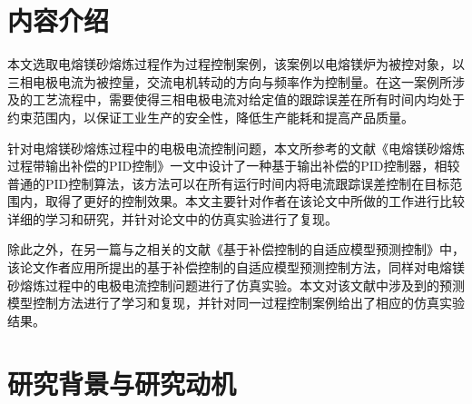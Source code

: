\documentclass[UTF8, 12pt]{article}
\begin{document}

\begin{titlepage}

\end{titlepage}

\tableofcontents
\cleardoublepage

%
\section{内容介绍}
本文选取电熔镁砂熔炼过程作为过程控制案例，该案例以电熔镁炉为被控对象，以三相电极电流为被控量，交流电机转动的方向与频率作为控制量。在这一案例所涉及的工艺流程中，需要使得三相电极电流对给定值的跟踪误差在所有时间内均处于约束范围内，以保证工业生产的安全性，降低生产能耗和提高产品质量。

针对电熔镁砂熔炼过程中的电极电流控制问题，本文所参考的文献《电熔镁砂熔炼过程带输出补偿的PID控制》一文中设计了一种基于输出补偿的PID控制器，相较普通的PID控制算法，该方法可以在所有运行时间内将电流跟踪误差控制在目标范围内，取得了更好的控制效果。本文主要针对作者在该论文中所做的工作进行比较详细的学习和研究，并针对论文中的仿真实验进行了复现。

除此之外，在另一篇与之相关的文献《基于补偿控制的自适应模型预测控制》中，该论文作者应用所提出的基于补偿控制的自适应模型预测控制方法，同样对电熔镁砂熔炼过程中的电极电流控制问题进行了仿真实验。本文对该文献中涉及到的预测模型控制方法进行了学习和复现，并针对同一过程控制案例给出了相应的仿真实验结果。






%
\section{研究背景与研究动机}
\end{document}
